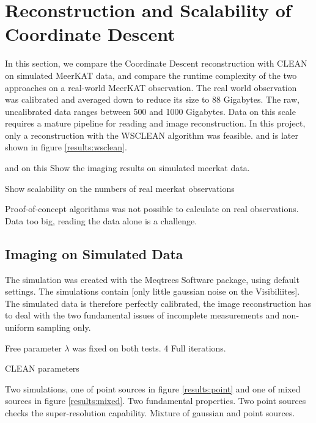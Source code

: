 \section{Reconstruction and Scalability of Coordinate Descent}
In this section, we compare the Coordinate Descent reconstruction with CLEAN on simulated MeerKAT data, and compare the runtime complexity of the two approaches on a real-world MeerKAT observation. The real world observation was calibrated and averaged down to reduce its size to 88 Gigabytes. The raw, uncalibrated data ranges between 500 and 1000 Gigabytes. Data on this scale requires a mature pipeline for reading and image reconstruction. In this project, only a reconstruction with the WSCLEAN\cite{offringa2014wsclean} algorithm was feasible. and is later shown in figure \ref{results:wsclean}.

 and on this 
Show the imaging results on simulated meerkat data.

Show scalability on the numbers of real meerkat observations

Proof-of-concept algorithms was not possible to calculate on real observations. Data too big, reading the data alone is a challenge.



\subsection{Imaging on Simulated Data}
The simulation was created with the Meqtrees Software package, using default settings. The simulations contain [only little gaussian noise on the Visibiliites]. The simulated data is therefore perfectly calibrated, the image reconstruction has to deal with the two fundamental issues of incomplete measurements and non-uniform sampling only.

Free parameter $\lambda$ was fixed on both tests. 4 Full iterations.

CLEAN parameters

Two simulations, one of point sources in figure \ref{results:point} and one of mixed sources in figure \ref{results:mixed}. Two fundamental properties. Two point sources checks the super-resolution capability. Mixture of gaussian and point sources. 

